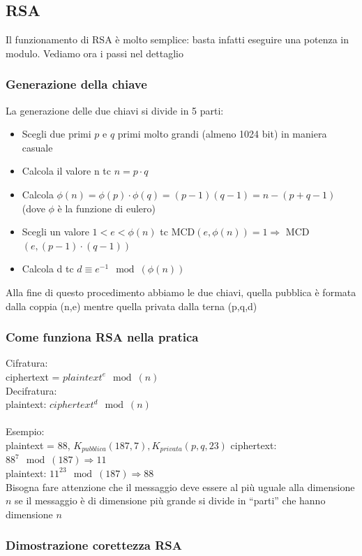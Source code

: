 \documentclass[10pt,a4paper]{article}
\begin{document}
\subsection{RSA}
Il funzionamento di RSA è molto semplice: basta infatti eseguire una potenza in modulo. Vediamo ora i passi nel dettaglio
\subsubsection{Generazione della chiave}
La generazione delle due chiavi si divide in 5 parti:
\begin{itemize}
\item Scegli due primi $p$ e $q$ primi molto grandi (almeno 1024 bit) in maniera casuale
\item Calcola il valore n tc $n = p \cdot q$
\item Calcola $\phi(n) = \phi(p) \cdot \phi(q) = (p - 1)(q - 1) = n - (p + q -1)$ (dove $\phi$ è la funzione di eulero)
\item Scegli un valore $1<e<\phi(n)$ tc MCD$(e, \phi(n))=1 \Rightarrow$ MCD$(e,(p-1)\cdot(q-1))$
\item Calcola d tc $d \equiv e^{-1} \mod (\phi(n))$
\end{itemize}

Alla fine di questo procedimento abbiamo le due chiavi, quella pubblica è formata dalla coppia (n,e) mentre quella privata dalla terna (p,q,d)

\subsubsection{Come funziona RSA nella pratica}
Cifratura:\\
ciphertext = $plaintext^e \mod(n)$\\
Decifratura:\\
plaintext: $ciphertext^d \mod(n)$\\ \\
Esempio:\\
plaintext = 88, $K_{pubblica}(187,7), K_{privata}(p,q,23)$
ciphertext: $88^{7} \mod(187) \Rightarrow 11$\\
plaintext: $11^{23} \mod(187) \Rightarrow 88$\\
Bisogna fare attenzione che il messaggio deve essere al più uguale alla dimensione $n$ se il messaggio è di dimensione più grande si divide in ``parti'' che hanno dimensione $n$

\subsubsection{Dimostrazione corettezza RSA}
\end{document}
